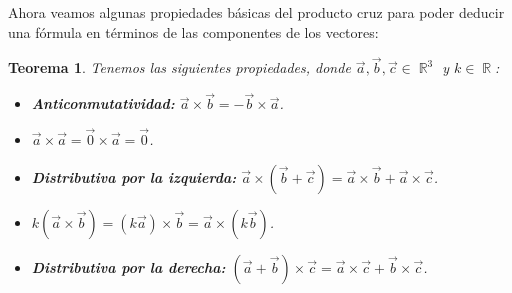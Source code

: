 \documentclass[12pt, fleqn]{report}                             %
\newtheorem{Theorem}{Teorema}[section]                          %
\theoremstyle{break}                                            %
\DeclareMathOperator \Reals        {\mathbb{R}}                 %
\newcommand{\Wrap}[1]{\left( #1 \right)}                        %
\begin{document}
            Ahora veamos algunas propiedades básicas del producto cruz para poder deducir una fórmula en términos de las componentes de los vectores:
            
            
            \begin{Theorem}
                Tenemos las siguientes propiedades, donde $\vec{a}, \vec{b}, \vec{c} \in \Reals^3$ y $k \in \Reals$:
                \begin{itemize}\setlength\itemsep{0em}
                    \item \textbf{Anticonmutatividad:} $\vec{a} \times \vec{b} = -\vec{b} \times \vec{a}$.
                    
                    \item $\vec{a} \times \vec{a} = \vec{0} \times \vec{a} = \vec{0}$.
                    
                    \item \textbf{Distributiva por la izquierda:} $\vec{a} \times \Wrap{\vec{b}+\vec{c}} = \vec{a} \times \vec{b} + \vec{a} \times \vec{c}$.
                    
                    \item $k\Wrap{\vec{a} \times \vec{b}} = \Wrap{k \vec{a}} \times \vec{b} = \vec{a} \times \Wrap{k \vec{b}}$.
                    
                    \item \textbf{Distributiva por la derecha:} $\Wrap{\vec{a}+\vec{b}} \times \vec{c} = \vec{a} \times \vec{c} + \vec{b} \times \vec{c}$.
                \end{itemize}
            \end{Theorem}
        
        
\end{document}
